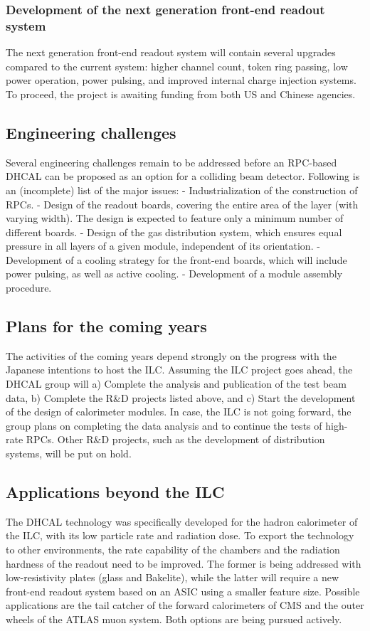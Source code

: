\subsubsection{Development of the next generation front-end readout system}
The next generation front-end readout system will contain several upgrades compared to the current system: higher channel count, token ring passing, low power operation, power pulsing, and improved internal charge injection systems. To proceed, the project is awaiting funding from both US and Chinese agencies.

\subsection{Engineering challenges}
Several engineering challenges remain to be addressed before an RPC-based DHCAL can be proposed as an option for a colliding beam detector. Following is an (incomplete) list of the major issues:
-   Industrialization of the construction of RPCs. 
-   Design of the readout boards, covering the entire area of the layer (with varying width). The design is expected to feature only a minimum number of different boards. 
-   Design of the gas distribution system, which ensures equal pressure in all layers of a given module, independent of its orientation.
-   Development of a cooling strategy for the front-end boards, which will include power pulsing, as well as active cooling.
-   Development of a module assembly procedure.

\subsection{Plans for the coming years}
The activities of the coming years depend strongly on the progress with the Japanese intentions to host the ILC. Assuming the ILC project goes ahead, the DHCAL group will
a)  Complete the analysis and publication of the test beam data,
b)  Complete the R\&D projects listed above, and
c)  Start the development of the design of calorimeter modules.
In case, the ILC is not going forward, the group plans on completing the data analysis and to continue the tests of high-rate RPCs. Other R\&D projects, such as the development of distribution systems, will be put on hold.
 
\subsection{Applications beyond the ILC}
The DHCAL technology was specifically developed for the hadron calorimeter of the ILC, with its low particle rate and radiation dose. To export the technology to other environments, the rate capability of the chambers and the radiation hardness of the readout need to be improved. The former is being addressed with low-resistivity plates (glass and Bakelite), while the latter will require a new front-end readout system based on an ASIC using a smaller feature size. Possible applications are the tail catcher of the forward calorimeters of CMS and the outer wheels of the ATLAS muon system. Both options are being pursued actively.

